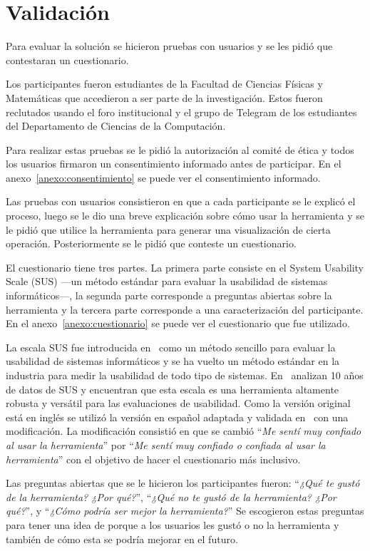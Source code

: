 \chapter{Validación}

Para evaluar la solución se hicieron pruebas con usuarios y se les pidió que contestaran un cuestionario. 

Los participantes fueron estudiantes de la Facultad de Ciencias Físicas y Matemáticas que accedieron a ser parte de la investigación. Estos fueron reclutados usando el foro institucional y el grupo de Telegram de los estudiantes del Departamento de Ciencias de la Computación.

Para realizar estas pruebas se le pidió la autorización al comité de ética y todos los usuarios firmaron un consentimiento informado antes de participar. En el anexo~\ref{anexo:consentimiento} se puede ver el consentimiento informado.

Las pruebas con usuarios consistieron en que a cada participante se le explicó el proceso, luego se le dio una breve explicación sobre cómo usar la herramienta y se le pidió que utilice la herramienta para generar una visualización de cierta operación. Posteriormente se le pidió que conteste un cuestionario.

El cuestionario tiene tres partes. La primera parte consiste en el System Usability Scale (SUS) ---un método estándar para evaluar la usabilidad de sistemas informáticos---, la segunda parte corresponde a preguntas abiertas sobre la herramienta y la tercera parte corresponde a una caracterización del participante. En el anexo~\ref{anexo:cuestionario} se puede ver el cuestionario que fue utilizado.

La escala SUS fue introducida en~\cite{brooke1996quick} como un método sencillo para evaluar la usabilidad de sistemas informáticos y se ha vuelto un método estándar en la industria para medir la usabilidad de todo tipo de sistemas. En~\cite{evaluation-of-sus} analizan 10 años de datos de SUS y encuentran que esta escala es una herramienta altamente robusta y versátil para las evaluaciones de usabilidad. Como la versión original está en inglés se utilizó la versión en español adaptada y validada en~\cite{spanish-sus} con una modificación. La modificación consistió en que se cambió ``\textit{Me sentí muy confiado al usar la herramienta}'' por ``\textit{Me sentí muy confiado o confiada al usar la herramienta}'' con el objetivo de hacer el cuestionario más inclusivo.

Las preguntas abiertas que se le hicieron los participantes fueron: ``\textit{¿Qué te gustó de la herramienta? ¿Por qué?}'', ``\textit{¿Qué no te gustó de la herramienta? ¿Por qué?}'', y ``\textit{¿Cómo podría ser mejor la herramienta?}'' Se escogieron estas preguntas para tener una idea de porque a los usuarios les gustó o no la herramienta y también de cómo esta se podría mejorar en el futuro.

